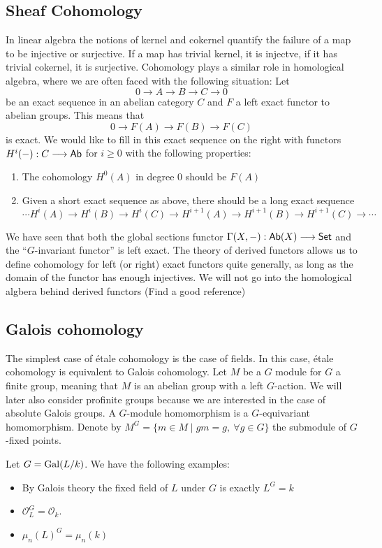 \subsection{Sheaf Cohomology}

In linear algebra the notions of kernel and cokernel quantify the failure of a map to be injective or surjective. If a map has trivial kernel, it is injectve, if it has trivial cokernel, it is surjective. Cohomology plays a similar role in homological algebra, where we are often faced with the following situation:
Let 
\[
	0 \to A \to B \to C \to 0
\]
be an exact sequence in an abelian category $C$ and $F$ a left exact functor to abelian groups. This means that 
\[
	0 \to F(A) \to F(B) \to F(C)
\]
is exact. We  would like to fill in this exact sequence on the right with functors $H^i(-): C \longrightarrow \mathsf{Ab}$ for $i \ge 0$ with the following properties:
\begin{enumerate}
	\item The cohomology $H^0(A)$ in degree 0 should be $F(A)$
	\item Given a short exact sequence as above, there should be a long exact sequence 
	\[ 
		\cdots H^i(A) \to H^i(B) \to H^i(C) \to H^{i+1}(A) \to H^{i+1}(B) \to H^{i+1}(C) \to \cdots
	\]
 \end{enumerate}

 We have seen that both the global sections functor $\Gamma(X,-): \mathsf{Ab}(X) \longrightarrow \mathsf{Set}$ and the ``$G$-invariant functor'' is left exact. The theory of derived functors allows us to define cohomology for left (or right) exact functors quite generally, as long as the domain of the functor has enough injectives. We will 
 not go into the homological algbera behind derived functors (Find a good reference)

\subsection{Galois cohomology}
The simplest case of \'etale cohomology is the case of fields. In this case, \'etale cohomology is equivalent to Galois cohomology.
Let $M$ be a $G$ module for $G$ a finite group, meaning that $M$ is an abelian group with a left $G$-action. We will later also consider profinite groups because we are interested in the case of absolute Galois groups. A $G$-module homomorphism is a $G$-equivariant homomorphism. Denote by $M^G = \{m \in M \mid gm = g, \ \forall g \in G\}$ the submodule of $G$-fixed points.
\begin{example}
	Let $G = \operatorname{Gal}(L/k)$. We have the following examples:
	\begin{itemize}
		\item By Galois theory the fixed field of $L$ under $G$ is exactly $L^G = k$
		\item $\mathcal{O}_L^G = \mathcal{O}_k$.
		\item $\mu_n(L)^G = \mu_n(k)$
	\end{itemize}
\end{example}

